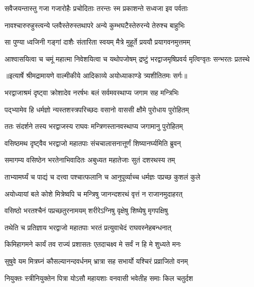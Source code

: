 \twolineshloka
{सवैजयन्तास्तु गजा गजारोहैः प्रचोदिताः}
{तरन्तः स्म प्रकाशन्ते सध्वजा इव पर्वताः} %

\twolineshloka
{नावश्चारुरुहुस्त्वन्ये प्लवैस्तेरुस्तथापरे}
{अन्ये कुम्भघटैस्तेरुरन्ये तेरुश्च बाहुभिः} %

\twolineshloka
{सा पुण्या ध्वजिनी गङ्गां दाशैः संतारिता स्वयम्}
{मैत्रे मुहूर्ते प्रययौ प्रयागवनमुत्तमम्} %

\fourlineindentedshloka
{आश्वासयित्वा च चमूं महात्मा}
{ निवेशयित्वा च यथोपजोषम्}
{द्रष्टुं भरद्वाजमृषिप्रवर्य}
{मृत्विग्वृतः सन्भरतः प्रतस्थे} %


{॥इत्यार्षे श्रीमद्रामायणे वाल्मीकीये आदिकाव्ये अयोध्याकाण्डे त्र्यशीतितमः सर्गः॥}


\twolineshloka
{भरद्वाजाश्रमं दृष्ट्वा क्रोशादेव नरर्षभः}
{बलं सर्वमवस्थाप्य जगाम सह मन्त्रिभिः} %

\twolineshloka
{पद्भ्यामेव हि धर्मज्ञो न्यस्तशस्त्रपरिच्छदः}
{वसानो वाससी क्षौमे पुरोधाय पुरोहितम्} %

\twolineshloka
{ततः संदर्शने तस्य भरद्वाजस्य राघवः}
{मन्त्रिणस्तानवस्थाप्य जगामानु पुरोहितम्} %

\twolineshloka
{वसिष्ठमथ दृष्ट्वैव भरद्वाजो महातपाः}
{संचचालासनात्तूर्णं शिष्यानर्घ्यमिति ब्रुवन्} %

\twolineshloka
{समागम्य वसिष्ठेन भरतेनाभिवादितः}
{अबुध्यत महातेजाः सुतं दशरथस्य तम्} %

\twolineshloka
{ताभ्यामर्घ्यं च पाद्यं च दत्त्वा पश्चात्फलानि च}
{आनुपूर्व्याच्च धर्मज्ञः पप्रच्छ कुशलं कुले} %

\twolineshloka
{अयोध्यायां बले कोशे मित्रेष्वपि च मन्त्रिषु}
{जानन्दशरथं वृत्तं न राजानमुदाहरत्} %

\twolineshloka
{वसिष्ठो भरतश्चैनं पप्रच्छतुरनामयम्}
{शरीरेऽग्निषु वृक्षेषु शिष्येषु मृगपक्षिषु} %

\twolineshloka
{तथेति च प्रतिज्ञाय भरद्वाजो महातपाः}
{भरतं प्रत्युवाचेदं राघवस्नेहबन्धनात्} %

\twolineshloka
{किमिहागमने कार्यं तव राज्यं प्रशासतः}
{एतदाचक्ष्व मे सर्वं न हि मे शुध्यते मनः} %

\twolineshloka
{सुषुवे यम मित्रघ्नं कौसल्यानन्दवर्धनम्}
{भ्रात्रा सह सभार्यो यश्चिरं प्रव्राजितो वनम्} %

\twolineshloka
{नियुक्तः स्त्रीनियुक्तेन पित्रा योऽसौ महायशाः}
{वनवासी भवेतीह समाः किल चतुर्दश} %

